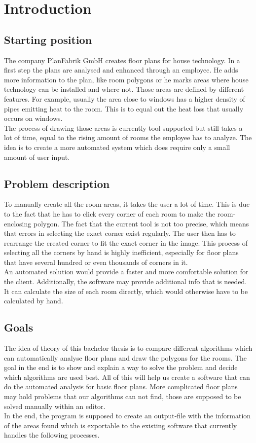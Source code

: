 \section{Introduction}
\subsection{Starting position}
The company PlanFabrik GmbH creates floor plans for house technology. In a first
step the plans are analysed and enhanced through an employee. He adds more
information to the plan, like room polygons or he marks areas where house technology
can be installed and where not. Those areas are defined by different features. For example, usually the area close to windows has a higher density of pipes emitting heat to the room. This is to equal out the heat loss that usually occurs on windows.
\\
The process of drawing those areas is currently tool supported but still takes a lot of time, equal to the rising amount of rooms the employee has to analyze. The idea is to create a more automated system which does require only a small amount of user input.

\subsection{Problem description}
\label{sub:ProblemDescription}
To manually create all the room-areas, it takes the user a lot of time. This is due to the fact that he has to click every corner of each room to make the room-enclosing polygon. The fact that the current tool is not too precise, which means that errors in selecting the exact corner exist regularly. The user then has to rearrange the created corner to fit the exact corner in the image. This process of selecting all the corners by hand is highly inefficient, especially for floor plans that have several hundred or even thousands of corners in it.
\\
An automated solution would provide a faster and more comfortable solution for the client. Additionally, the software may provide additional info that is needed. It can calculate the size of each room directly, which would otherwise have to be calculated by hand.

\subsection{Goals}
The idea of theory of this bachelor thesis is to compare different algorithms which can automatically analyse floor plans and draw the polygons for the rooms. The goal in the end is to show and explain a way to solve the problem and decide which algorithms are used best. All of this will help us create a software that can do the automated analysis for basic floor plans. More complicated floor plans may hold problems that our algorithms can not find, those are supposed to be solved manually within an editor.
\\
In the end, the program is supposed to create an output-file with the information of the areas found which is exportable to the existing software that currently handles the following processes.


